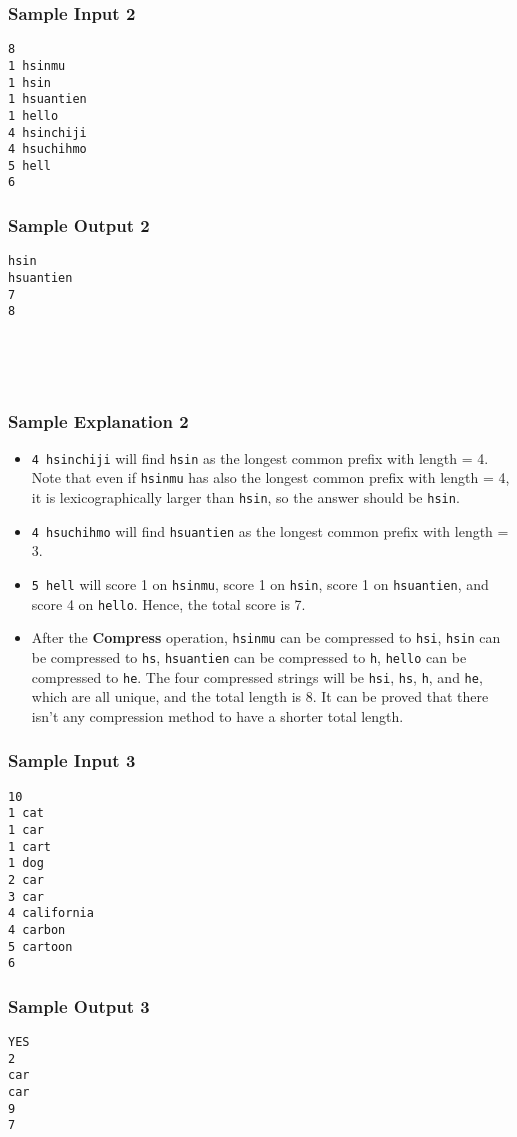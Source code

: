 \newpage

\begin{multicols}{2}
\subsubsection{Sample Input 2}
\begin{verbatim}
8
1 hsinmu
1 hsin
1 hsuantien
1 hello
4 hsinchiji
4 hsuchihmo
5 hell
6
\end{verbatim}
\columnbreak
\subsubsection{Sample Output 2}
\begin{verbatim}
hsin
hsuantien
7
8





\end{verbatim}
\end{multicols}

\subsubsection{Sample Explanation 2}

\begin{itemize}
    \item \texttt{4 hsinchiji} will find \texttt{hsin} as the longest common prefix with length = 4. Note that even if \texttt{hsinmu} has also the longest common prefix with length = 4, it is lexicographically larger than \texttt{hsin}, so the answer should be \texttt{hsin}.
    \item \texttt{4 hsuchihmo} will find \texttt{hsuantien} as the longest common prefix with length = 3.
    \item \texttt{5 hell} will score 1 on \texttt{hsinmu}, score 1 on \texttt{hsin}, score 1 on \texttt{hsuantien}, and score 4 on \texttt{hello}. Hence, the total score is 7.
    \item After the \textbf{Compress} operation, \texttt{hsinmu} can be compressed to \texttt{hsi}, \texttt{hsin} can be compressed to \texttt{hs}, \texttt{hsuantien} can be compressed to \texttt{h}, \texttt{hello} can be compressed to \texttt{he}. The four compressed strings will be \texttt{hsi}, \texttt{hs}, \texttt{h}, and \texttt{he}, which are all unique, and the total length is 8. It can be proved that there isn't any compression method to have a shorter total length.
\end{itemize}

\begin{multicols}{2}
\subsubsection{Sample Input 3}
\begin{verbatim}
10
1 cat
1 car
1 cart
1 dog
2 car
3 car
4 california
4 carbon
5 cartoon
6
\end{verbatim}
\columnbreak
\subsubsection{Sample Output 3}
\begin{verbatim}
YES
2
car
car
9
7





\end{verbatim}
\end{multicols}
